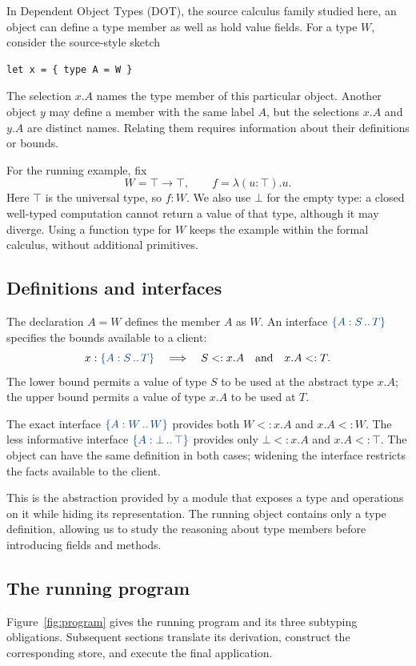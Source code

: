 \label{sec:objects}

In Dependent Object Types (DOT), the source calculus family studied here,
an object can define a type member as well as hold value fields.
For a type $W$, consider the source-style sketch
\begin{lstlisting}
let x = { type A = W }
\end{lstlisting}
The selection $x.A$ names the type member of this particular object.
Another object $y$ may define a member with the same label $A$, but the
selections $x.A$ and $y.A$ are distinct names. Relating them requires
information about their definitions or bounds.

For the running example, fix
\[
  W=\top\to\top,\qquad f=\lambda(u:\top).u.
\]
Here $\top$ is the universal type, so $f:W$. We also use $\bot$ for the
empty type: a closed well-typed computation cannot return a value of
that type, although it may diverge. Using a function type for $W$ keeps
the example within the formal calculus, without additional primitives.

\subsection*{Definitions and interfaces}
The declaration $A=W$ defines the member $A$ as $W$. An interface
$\iface{S}{T}$ specifies the bounds available to a client:
\[
  x:\iface{S}{T}
  \quad\Longrightarrow\quad
  S<:x.A\quad\hbox{and}\quad x.A<:T.
\]
The lower bound permits a value of type $S$ to be used at the abstract
type $x.A$; the upper bound permits a value of type $x.A$ to be used
at $T$.

The exact interface $\iface{W}{W}$ provides both $W<:x.A$ and $x.A<:W$.
The less informative interface $\iface{\bot}{\top}$ provides only
$\bot<:x.A$ and $x.A<:\top$. The object can have the same definition in
both cases; widening the interface restricts the facts available to the
client.

This is the abstraction provided by a module that exposes a type and
operations on it while hiding its representation. The running object
contains only a type definition, allowing us to study the reasoning
about type members before introducing fields and methods.

\subsection*{The running program}
Figure~\ref{fig:program} gives the running program and its three subtyping
obligations. Subsequent sections translate its derivation, construct the
corresponding store, and execute the final application.


